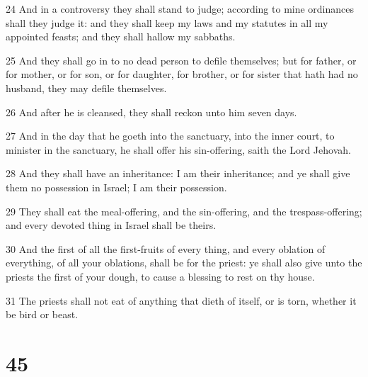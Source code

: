 \par 24 And in a controversy they shall stand to judge; according to mine ordinances shall they judge it: and they shall keep my laws and my statutes in all my appointed feasts; and they shall hallow my sabbaths.
\par 25 And they shall go in to no dead person to defile themselves; but for father, or for mother, or for son, or for daughter, for brother, or for sister that hath had no husband, they may defile themselves.
\par 26 And after he is cleansed, they shall reckon unto him seven days.
\par 27 And in the day that he goeth into the sanctuary, into the inner court, to minister in the sanctuary, he shall offer his sin-offering, saith the Lord Jehovah.
\par 28 And they shall have an inheritance: I am their inheritance; and ye shall give them no possession in Israel; I am their possession.
\par 29 They shall eat the meal-offering, and the sin-offering, and the trespass-offering; and every devoted thing in Israel shall be theirs.
\par 30 And the first of all the first-fruits of every thing, and every oblation of everything, of all your oblations, shall be for the priest: ye shall also give unto the priests the first of your dough, to cause a blessing to rest on thy house.
\par 31 The priests shall not eat of anything that dieth of itself, or is torn, whether it be bird or beast.

\chapter{45}

